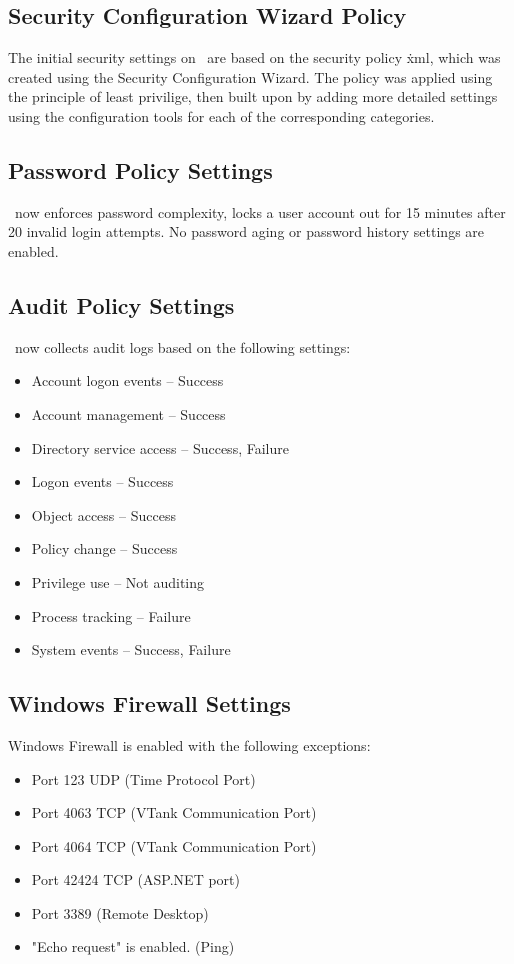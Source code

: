 \subsection{Security Configuration Wizard Policy}

The initial security settings on \GameServer\ are based on the security policy \GameServer\.xml, which was created using the Security Configuration Wizard.  The policy was applied using the principle of least privilige, then built upon by adding more detailed settings using the configuration tools for each of the corresponding categories.

\subsection{Password Policy Settings}

\GameServer\ now enforces password complexity, locks a user account out for 15 minutes after 20 invalid login attempts.  No password aging or password history settings are enabled.

\subsection{Audit Policy Settings}
\GameServer\ now collects audit logs based on the following settings:
\begin{itemize}
\item Account logon events -- Success
\item Account management -- Success
\item Directory service access -- Success, Failure
\item Logon events -- Success
\item Object access -- Success
\item Policy change -- Success
\item Privilege use -- Not auditing
\item Process tracking -- Failure
\item System events -- Success, Failure
\end{itemize}

\subsection{Windows Firewall Settings}
Windows Firewall is enabled with the following exceptions:
\begin{itemize}
\item Port 123 UDP (Time Protocol Port)
\item Port 4063 TCP  (VTank Communication Port)
\item Port 4064 TCP  (VTank Communication Port)
\item Port 42424 TCP (ASP.NET port)
\item Port 3389 (Remote Desktop)
\item "Echo request" is enabled. (Ping)
\end{itemize}

